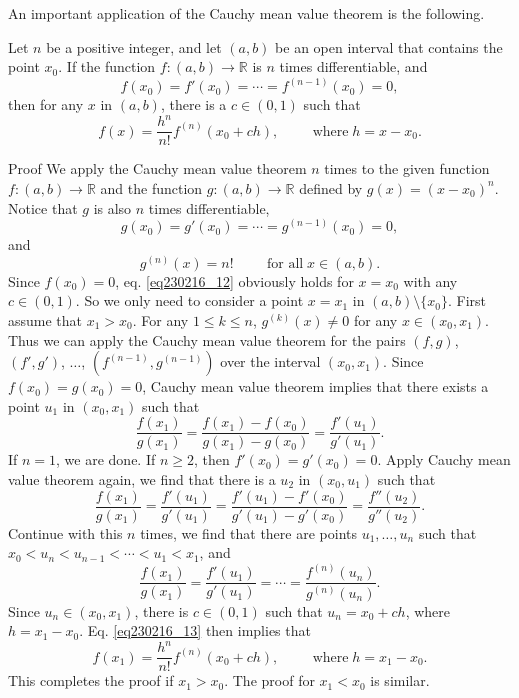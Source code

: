 An important application of the Cauchy mean value theorem is the following.
\begin{theorem}[label=thm230216_11]{}
Let $n$ be a positive integer, and let $(a, b)$ be an open interval that contains the point $x_0$. If the function $f:(a, b)\to\mathbb{R}$ is $n$ times differentiable, and
\[f(x_0)=f'(x_0)=\cdots=f^{(n-1)}(x_0)=0,\]
then for any $x$ in $ (a, b)$, there is a $c\in (0,1)$ such that
\begin{equation}\label{eq230216_12}f(x)=\frac{h^n}{n!}f^{(n)}(x_0+ch),\hspace{1cm}\text{where}\;h=x-x_0.\end{equation}
\end{theorem}
\begin{myproof}{Proof}
We apply the Cauchy mean value theorem $n$ times to the given  function $f:(a, b)\to\mathbb{R}$ and the function $g:(a,b)\to\mathbb{R}$ defined by $g(x)=(x-x_0)^n$.
Notice that $g$ is also $n$ times differentiable,
\[g(x_0)=g'(x_0)=\cdots=g^{(n-1)}(x_0)=0,\] and 
\[g^{(n)}(x)=n!\hspace{1cm}\text{for all}\;x\in (a, b).\]
Since $f(x_0)=0$, eq. \eqref{eq230216_12} obviously holds for $x=x_0$ with any $c\in (0,1)$. So we only need to consider a point $x =x_1$ in $(a, b)\setminus\{ x_0\}$. First assume that $ x_1>x_0$. For any $1\leq k\leq n$, $g^{(k)}(x)\neq 0$ for any $x\in (x_0, x_1)$. Thus we can apply the Cauchy mean value theorem for the pairs $(f, g)$, $(f', g')$, $\ldots$, $(f^{(n-1)}, g^{(n-1)})$ over the interval $(x_0, x_1)$. \bp
Since $f(x_0)=g(x_0)=0$, Cauchy mean value theorem implies that there exists a point $u_1$ in $(x_0, x_1)$ such that
\[\frac{f(x_1)}{g(x_1)}=\frac{f(x_1)-f(x_0)}{g(x_1)-g(x_0)}=\frac{f'(u_1)}{g'(u_1)}.\]If $n=1$, we are done. If $n\geq 2$, then $f'(x_0)=g'(x_0)=0$. Apply Cauchy mean value theorem again, we find that there is a $u_2$ in $(x_0, u_1)$ such that
\[\frac{f(x_1)}{g(x_1)}=\frac{f'(u_1)}{g'(u_1)}=\frac{f'(u_1)-f'(x_0)}{g'(u_1)-g'(x_0)}=\frac{f''(u_2)}{g''(u_2)}.\]
Continue with this $n$ times, we find that there are points $u_1, \ldots, u_n$ such that $x_0<u_n<u_{n-1}<\cdots<u_1<x_1$, and
\begin{equation}\label{eq230216_13}\frac{f(x_1)}{g(x_1)}=\frac{f'(u_1)}{g'(u_1)}=\cdots=\frac{f^{(n)}(u_n)}{g^{(n)}(u_n)}.\end{equation}
Since $u_n\in (x_0, x_1)$, there is $c\in (0,1)$ such that $u_n=x_0+ch$, where $h=x_1-x_0$. Eq. \eqref{eq230216_13} then  implies that
\[f(x_1)=\frac{h^n}{n!} f^{(n)}(x_0+ch),\hspace{1cm}\text{where}\;h=x_1-x_0.\]
This completes the proof if $x_1>x_0$. The proof for $x_1<x_0$ is similar.
\end{myproof}

